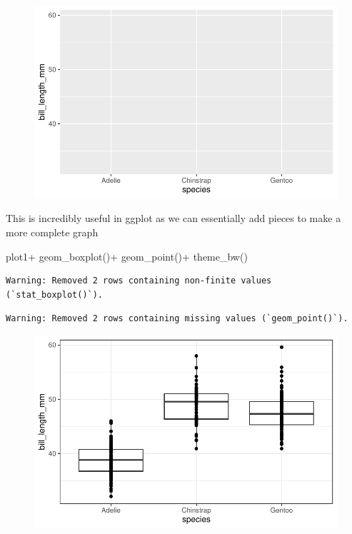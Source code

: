 \documentclass[
  letterpaper,
  DIV=11,
  numbers=noendperiod]{scrartcl}
\newenvironment{Shaded}{\begin{snugshade}}{\end{snugshade}}
\newcommand{\FunctionTok}[1]{\textcolor[rgb]{0.28,0.35,0.67}{#1}}
\newcommand{\NormalTok}[1]{\textcolor[rgb]{0.00,0.23,0.31}{#1}}
\newcommand{\SpecialCharTok}[1]{\textcolor[rgb]{0.37,0.37,0.37}{#1}}
\begin{document}
\begin{figure}[H]

{\centering \includegraphics{basic_graphs_files/figure-pdf/unnamed-chunk-4-1.pdf}

}

\end{figure}

This is incredibly useful in ggplot as we can essentially add pieces to
make a more complete graph

\begin{Shaded}
\begin{Highlighting}[]
\NormalTok{plot1}\SpecialCharTok{+}
  \FunctionTok{geom\_boxplot}\NormalTok{()}\SpecialCharTok{+}
  \FunctionTok{geom\_point}\NormalTok{()}\SpecialCharTok{+}
  \FunctionTok{theme\_bw}\NormalTok{()}
\end{Highlighting}
\end{Shaded}

\begin{verbatim}
Warning: Removed 2 rows containing non-finite values (`stat_boxplot()`).
\end{verbatim}

\begin{verbatim}
Warning: Removed 2 rows containing missing values (`geom_point()`).
\end{verbatim}

\begin{figure}[H]

{\centering \includegraphics{basic_graphs_files/figure-pdf/unnamed-chunk-5-1.pdf}

}

\end{figure}
\end{document}

